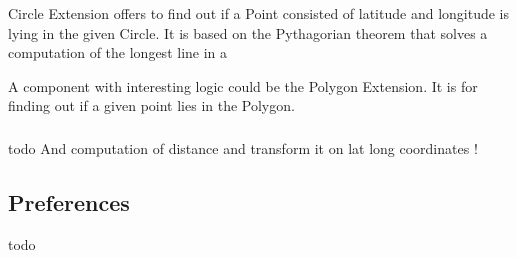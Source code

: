Circle Extension offers to find out if a Point\cite{} consisted of latitude and longitude is lying in the given Circle\cite{}.
It is based on the Pythagorian theorem that solves a computation of the longest line in a

A component with interesting logic could be the Polygon Extension.
It is for finding out if a given point lies in the Polygon.

\subsubsection{}


\subsubsection{}
todo
And computation of distance and transform it on lat long coordinates !

\subsection{Preferences}\label{subsec:preferences}
todo
